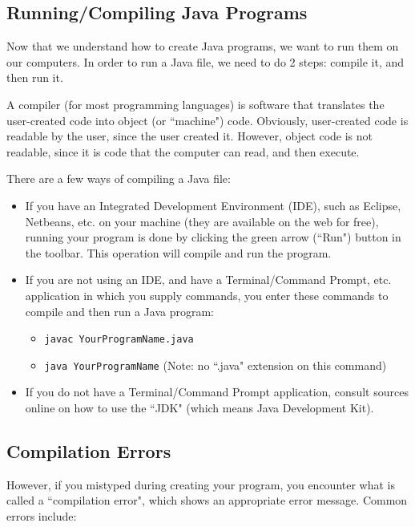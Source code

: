 \subsection{Running/Compiling Java Programs}
Now that we understand how to create Java programs, we want to run them on our computers. In order to run a Java file, we need to do 2 steps: compile it, and then run it.

\par A compiler (for most programming languages) is software that translates the user-created code into object (or ``machine") code. Obviously, user-created code is readable by the user, since the user created it. However, object code is not readable, since it is code that the computer can read, and then execute.

\par There are a few ways of compiling a Java file:
\begin{itemize}
\item If you have an Integrated Development Environment (IDE), such as Eclipse, Netbeans, etc. on your machine (they are available on the web for free), running your program is done by clicking the green arrow (``Run") button in the toolbar. This operation will compile and run the program.

\item If you are not using an IDE, and have a Terminal/Command Prompt, etc. application in which you supply commands, you enter these commands to compile and then run a Java program:
\begin{itemize}
\item \texttt{javac YourProgramName.java}
\item \texttt{java YourProgramName} (Note: no ``.java" extension on this command)
\end{itemize}

\item If you do not have a Terminal/Command Prompt application, consult sources online on how to use the ``JDK" (which means Java Development Kit).
\end{itemize}

\subsection{Compilation Errors}
However, if you mistyped during creating your program, you encounter what is called a ``compilation error", which shows an appropriate error message. Common errors include:

